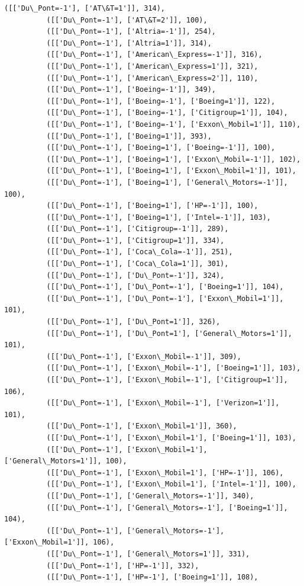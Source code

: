 \documentclass[11pt]{article}
\begin{document}
\begin{Verbatim}[commandchars=\\\{\}]
          ([['Du\_Pont=-1'], ['AT\&T=1']], 314),
          ([['Du\_Pont=-1'], ['AT\&T=2']], 100),
          ([['Du\_Pont=-1'], ['Altria=-1']], 254),
          ([['Du\_Pont=-1'], ['Altria=1']], 314),
          ([['Du\_Pont=-1'], ['American\_Express=-1']], 316),
          ([['Du\_Pont=-1'], ['American\_Express=1']], 321),
          ([['Du\_Pont=-1'], ['American\_Express=2']], 110),
          ([['Du\_Pont=-1'], ['Boeing=-1']], 349),
          ([['Du\_Pont=-1'], ['Boeing=-1'], ['Boeing=1']], 122),
          ([['Du\_Pont=-1'], ['Boeing=-1'], ['Citigroup=1']], 104),
          ([['Du\_Pont=-1'], ['Boeing=-1'], ['Exxon\_Mobil=1']], 110),
          ([['Du\_Pont=-1'], ['Boeing=1']], 393),
          ([['Du\_Pont=-1'], ['Boeing=1'], ['Boeing=-1']], 100),
          ([['Du\_Pont=-1'], ['Boeing=1'], ['Exxon\_Mobil=-1']], 102),
          ([['Du\_Pont=-1'], ['Boeing=1'], ['Exxon\_Mobil=1']], 101),
          ([['Du\_Pont=-1'], ['Boeing=1'], ['General\_Motors=-1']], 100),
          ([['Du\_Pont=-1'], ['Boeing=1'], ['HP=-1']], 100),
          ([['Du\_Pont=-1'], ['Boeing=1'], ['Intel=-1']], 103),
          ([['Du\_Pont=-1'], ['Citigroup=-1']], 289),
          ([['Du\_Pont=-1'], ['Citigroup=1']], 334),
          ([['Du\_Pont=-1'], ['Coca\_Cola=-1']], 251),
          ([['Du\_Pont=-1'], ['Coca\_Cola=1']], 301),
          ([['Du\_Pont=-1'], ['Du\_Pont=-1']], 324),
          ([['Du\_Pont=-1'], ['Du\_Pont=-1'], ['Boeing=1']], 104),
          ([['Du\_Pont=-1'], ['Du\_Pont=-1'], ['Exxon\_Mobil=1']], 101),
          ([['Du\_Pont=-1'], ['Du\_Pont=1']], 326),
          ([['Du\_Pont=-1'], ['Du\_Pont=1'], ['General\_Motors=1']], 101),
          ([['Du\_Pont=-1'], ['Exxon\_Mobil=-1']], 309),
          ([['Du\_Pont=-1'], ['Exxon\_Mobil=-1'], ['Boeing=1']], 103),
          ([['Du\_Pont=-1'], ['Exxon\_Mobil=-1'], ['Citigroup=1']], 106),
          ([['Du\_Pont=-1'], ['Exxon\_Mobil=-1'], ['Verizon=1']], 101),
          ([['Du\_Pont=-1'], ['Exxon\_Mobil=1']], 360),
          ([['Du\_Pont=-1'], ['Exxon\_Mobil=1'], ['Boeing=1']], 103),
          ([['Du\_Pont=-1'], ['Exxon\_Mobil=1'], ['General\_Motors=1']], 100),
          ([['Du\_Pont=-1'], ['Exxon\_Mobil=1'], ['HP=-1']], 106),
          ([['Du\_Pont=-1'], ['Exxon\_Mobil=1'], ['Intel=-1']], 100),
          ([['Du\_Pont=-1'], ['General\_Motors=-1']], 340),
          ([['Du\_Pont=-1'], ['General\_Motors=-1'], ['Boeing=1']], 104),
          ([['Du\_Pont=-1'], ['General\_Motors=-1'], ['Exxon\_Mobil=1']], 106),
          ([['Du\_Pont=-1'], ['General\_Motors=1']], 331),
          ([['Du\_Pont=-1'], ['HP=-1']], 332),
          ([['Du\_Pont=-1'], ['HP=-1'], ['Boeing=1']], 108),

\end{Verbatim}
\end{document}
